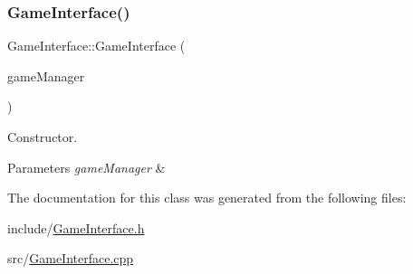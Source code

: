 \subsubsection{\texorpdfstring{Game\+Interface()}{GameInterface()}}
{\footnotesize\ttfamily Game\+Interface\+::\+Game\+Interface (\begin{DoxyParamCaption}\item[{\hyperlink{classGameManager}{Game\+Manager} $\ast$}]{game\+Manager }\end{DoxyParamCaption})}



Constructor. 


\begin{DoxyParams}{Parameters}
{\em game\+Manager} & \\
\hline
\end{DoxyParams}


The documentation for this class was generated from the following files\+:\begin{DoxyCompactItemize}
\item 
include/\hyperlink{GameInterface_8h}{Game\+Interface.\+h}\item 
src/\hyperlink{GameInterface_8cpp}{Game\+Interface.\+cpp}\end{DoxyCompactItemize}
